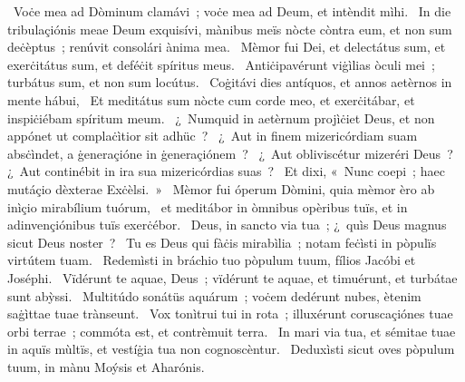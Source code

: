 \psalmChapterWithInscription{}
{ }
{%
~Voċe mea ad Dòminum clamávi~; voċe mea ad Deum, et intèndit mìhi. 
~In die tribulaçiónis meae Deum exquisívi, mànibus meïs nòcte còntra eum, et non sum deċèptus~; renúvit consolári ànima mea. 
~Mèmor fui Dei, et delectátus sum, et exerċitátus sum, et deféċit spíritus meus. 
~Antiċipavérunt viġìlias òculi mei~; turbátus sum, et non sum locútus. 
~Coġitávi dies antíquos, et annos aetèrnos in mente hábui, 
~Et meditátus sum nòcte cum corde meo, et exerċitábar, et inspiċiébam spíritum meum. 
~¿~Numquid in aetèrnum projìċiet Deus, et non appónet ut complaċìtior sit adhüc~? 
~¿~Aut in finem mizericórdiam suam absċìndet, a ġeneraçióne in ġeneraçiónem~? 
~¿~Aut obliviscétur mizeréri Deus~? ¿~Aut continébit in ira sua mizericórdias suas~? 
~Et dixi, «~Nunc coepi~; haec mutáçio dèxterae Exċèlsi.~»
~Mèmor fui óperum Dòmini, quia mèmor èro ab inìçio mirabílium tuórum, 
~et meditábor in òmnibus opèribus tuïs, et in adinvençiónibus tuïs exerċébor. 
~Deus, in sancto via tua~; ¿~quìs Deus magnus sicut Deus noster~? 
~Tu es Deus qui fàċis mirabìlia~; notam feċìsti in pòpulïs virtútem tuam. 
~Redemìsti in bráchio tuo pòpulum tuum, fílios Jacóbi et Joséphi. 
~Vïdérunt te aquae, Deus~; vïdérunt te aquae, et timuérunt, et turbátae sunt abỳssi. 
~Multitúdo sonátüs aquárum~; voċem dedérunt nubes, ètenim saġìttae tuae trànseunt. 
~Vox tonìtrui tui in rota~; illuxérunt coruscaçiónes tuae orbi terrae~; commóta est, et contrèmuit terra. 
~In mari via tua, et sémitae tuae in aquïs mùltïs, et vestíġia tua non cognoscèntur. 
~Deduxìsti sicut oves pòpulum tuum, in mànu Moýsis et Aharónis. 
}
